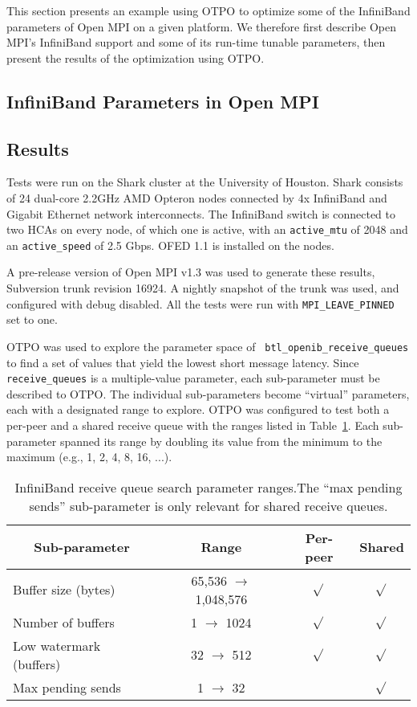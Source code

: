 This section presents an example using OTPO to optimize some of the
InfiniBand parameters of Open MPI on a given platform.  We therefore
first describe Open MPI's InfiniBand support and some of its run-time
tunable parameters, then present the results of the optimization using
OTPO.

\subsection{InfiniBand Parameters in Open MPI}



\subsection{Results}

Tests were run on the Shark cluster at the University of Houston.
Shark consists of 24 dual-core 2.2GHz AMD Opteron nodes connected by
4x InfiniBand and Gigabit Ethernet network interconnects.  
The InfiniBand switch is connected to two HCAs on every node, of which one is
active, with an {\tt active\_mtu} of 2048 and an {\tt active\_speed} of 2.5
Gbps. OFED 1.1 is installed on the nodes. 

A pre-release version of Open MPI v1.3 was used to generate these
results, Subversion trunk revision 16924. A nightly snapshot of the trunk was
used, and configured with debug disabled. All the tests were run with
{\tt MPI\_LEAVE\_PINNED} set to one.

OTPO was used to explore the parameter space of {\tt
  btl\_\-openib\_\-receive\_\-queues} to find a set of values that
yield the lowest short message latency.  Since {\tt receive\_\-queues}
is a multiple-value parameter, each sub-parameter must be described to
OTPO.  The individual sub-parameters become ``virtual'' parameters,
each with a designated range to explore.  OTPO was configured to test
both a per-peer and a shared receive queue with the ranges listed in
Table~\ref{table:eval-queue-search-params}.  Each sub-parameter
spanned its range by doubling its value from the minimum to the
maximum (e.g., 1, 2, 4, 8, 16, ...).

\def\yes{$\sqrt{}$}

\begin{table}[tb]
\centering
\caption{InfiniBand receive queue search parameter ranges.The ``max
  pending sends'' sub-parameter is only relevant for shared receive
  queues.}
\label{table:eval-queue-search-params} 
\begin{tabular}{|l|c|c|c|} 
\multicolumn{1}{c}{Sub-parameter} &
\multicolumn{1}{c}{Range} &
\multicolumn{1}{c}{Per-peer} &
\multicolumn{1}{c}{Shared} \\
\hline
Buffer size (bytes) & 65,536 $\rightarrow$ 1,048,576 & \yes & \yes \\
Number of buffers & 1 $\rightarrow$ 1024 & \yes & \yes \\
Low watermark (buffers) & 32 $\rightarrow$ 512  & \yes & \yes \\
Max pending sends & 1 $\rightarrow$ 32 & & \yes \\
\hline
\end{tabular}
\end{table}

